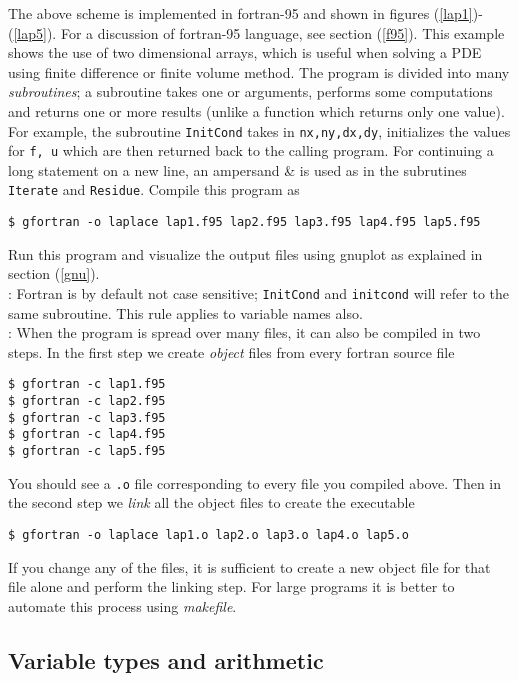 \documentclass[11pt,oneside]{amsart}
\begin{document}
The above scheme is implemented in fortran-95 and shown in figures (\ref{lap1})-(\ref{lap5}). For a discussion of fortran-95 language, see section (\ref{f95}). This example shows the use of two dimensional arrays, which is useful when solving a PDE using finite difference or finite volume method. The program is divided into many {\em subroutines}; a subroutine takes one or arguments, performs some computations and returns one or more results (unlike a function which returns only one value). For example, the subroutine {\tt InitCond} takes in {\tt nx,ny,dx,dy}, initializes the values for {\tt f, u} which are then returned back to the calling program. For continuing a long statement on a new line, an ampersand \& is used as in the subrutines {\tt Iterate} and {\tt Residue}. Compile this program as
\begin{verbatim}
$ gfortran -o laplace lap1.f95 lap2.f95 lap3.f95 lap4.f95 lap5.f95
\end{verbatim}
Run this program and visualize the output files using gnuplot as explained in section (\ref{gnu}). \\

:
Fortran is by default not case sensitive; {\tt InitCond} and {\tt initcond} will refer to the same subroutine. This rule applies to variable names also.\\

:
When the program is spread over many files, it can also be compiled in two steps. In the first step we create {\em object} files from every fortran source file
\begin{verbatim}
$ gfortran -c lap1.f95
$ gfortran -c lap2.f95
$ gfortran -c lap3.f95
$ gfortran -c lap4.f95
$ gfortran -c lap5.f95
\end{verbatim}
You should see a {\tt .o} file corresponding to every file you compiled above. Then in the second step we {\em link} all the object files to create the executable
\begin{verbatim}
$ gfortran -o laplace lap1.o lap2.o lap3.o lap4.o lap5.o
\end{verbatim}
If you change any of the files, it is sufficient to create a new object file for that file alone and perform the linking step. For large programs it is better to automate this process using {\em makefile}.

\subsection{Variable types and arithmetic}
\end{document}
